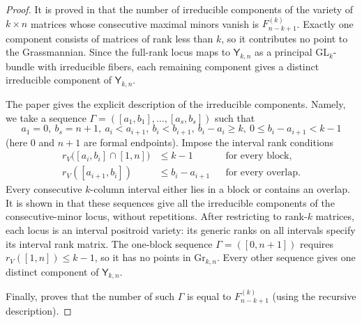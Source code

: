 \documentclass[11pt]{amsart}
\numberwithin{equation}{section}
\begin{document}
\begin{proof}
It is proved in \cite{HS04} that the number of irreducible components of the variety of $k\times n$ matrices
whose consecutive maximal minors vanish is $F^{(k)}_{n-k+1}$. Exactly one
component consists of matrices of rank less than $k$, so it contributes no point to the Grassmannian.
Since the full-rank locus maps to ${\mathsf Y}_{k,n}$ as a principal $\mathrm{GL}_k$-bundle with irreducible fibers,
each remaining component gives a distinct irreducible component of ${\mathsf Y}_{k,n}$.

The paper \cite{HS04} gives the explicit description of the irreducible components. Namely, 
we take a sequence $\Gamma=([a_1,b_1],\ldots,[a_s,b_s])$
such that 
\[
a_1=0,\ b_s=n+1,\
a_i<a_{i+1},\ b_i<b_{i+1},\
b_i-a_i\ge k,\
0\le b_i-a_{i+1}<k-1
\]
(here $0$ and $n+1$ are formal endpoints).
Impose the interval rank conditions
\[
\begin{aligned}
r_V\bigl([a_i,b_i]\cap[1,n]\bigr)&\le k-1
&&\text{for every block},\\
r_V([a_{i+1},b_i])&\le b_i-a_{i+1}
&&\text{for every overlap}.
\end{aligned}
\]
Every consecutive $k$-column interval either lies in a block or contains an overlap.
It is shown in \cite{HS04} that these sequences give all the irreducible components of 
the consecutive-minor locus, without repetitions. After restricting to rank-$k$ matrices, 
each locus is an interval positroid variety: its generic ranks on all intervals specify 
its interval rank matrix. The one-block sequence $\Gamma=([0,n+1])$ requires 
$r_V([1,n])\le k-1$, so it has no points in $\mathrm{Gr}_{k,n}$. Every other sequence 
gives one distinct component of ${\mathsf Y}_{k,n}$.

Finally, \cite{HS04} proves that the number of such $\Gamma$ is equal to $F^{(k)}_{n-k+1}$
(using the recursive description).
\end{proof}
\end{document}
